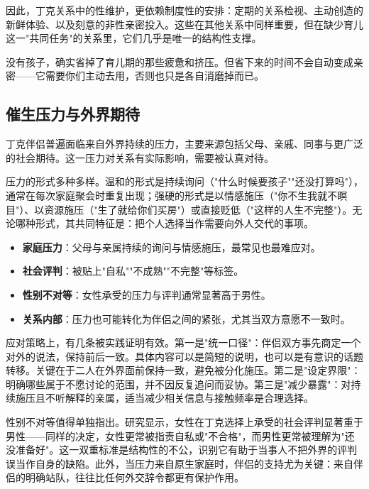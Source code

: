 \documentclass[12pt,UTF8]{ctexbook}
\newcommand{\keyword}[1]{\textbf{#1}}
\begin{document}
因此，丁克关系中的性维护，更依赖制度性的安排：定期的关系检视、主动创造的新鲜体验、以及刻意的非性亲密投入。这些在其他关系中同样重要，但在缺少育儿这一"共同任务"的关系里，它们几乎是唯一的结构性支撑。

\begin{tcolorbox}[colback=pink!5!white,colframe=red!50!black,title=贴心小叮咛]
	没有孩子，确实省掉了育儿期的那些疲惫和挤压。但省下来的时间不会自动变成亲密——它需要你们主动去用，否则也只是各自消磨掉而已。
\end{tcolorbox}
\subsection{催生压力与外界期待}

丁克伴侣普遍面临来自外界持续的压力，主要来源包括父母、亲戚、同事与更广泛的社会期待。这一压力对关系有实际影响，需要被认真对待。

压力的形式多种多样。温和的形式是持续询问（"什么时候要孩子""还没打算吗"），通常在每次家庭聚会时重复出现；强硬的形式是以情感施压（"你不生我就不瞑目"）、以资源施压（"生了就给你们买房"）或直接贬低（"这样的人生不完整"）。无论哪种形式，其共同特征是：把个人选择当作需要向外人交代的事项。

\begin{itemize}
	\item \keyword{家庭压力}：父母与亲属持续的询问与情感施压，最常见也最难应对。
	\item \keyword{社会评判}：被贴上"自私""不成熟""不完整"等标签。
	\item \keyword{性别不对等}：女性承受的压力与评判通常显著高于男性。
	\item \keyword{关系内部}：压力也可能转化为伴侣之间的紧张，尤其当双方意愿不一致时。
\end{itemize}

应对策略上，有几条被实践证明有效。第一是"统一口径"：伴侣双方事先商定一个对外的说法，保持前后一致。具体内容可以是简短的说明，也可以是有意识的话题转移。关键在于二人在外界面前保持一致，避免被分化施压。第二是"设定界限"：明确哪些属于不愿讨论的范围，并不因反复追问而妥协。第三是"减少暴露"：对持续施压且不听解释的亲属，适当减少相关信息与接触频率是合理选择。

性别不对等值得单独指出。研究显示，女性在丁克选择上承受的社会评判显著重于男性——同样的决定，女性更常被指责自私或"不合格"，而男性更常被理解为"还没准备好"。这一双重标准是结构性的不公，识别它有助于当事人不把外界的评判误当作自身的缺陷。此外，当压力来自原生家庭时，伴侣的支持尤为关键：来自伴侣的明确站队，往往比任何外交辞令都更有保护作用。
\end{document}
